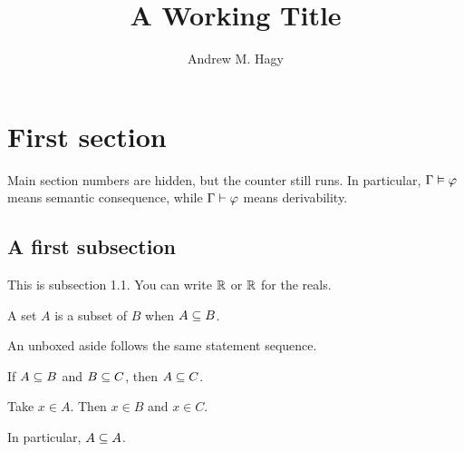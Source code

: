 \documentclass[11pt,letterpaper,twoside]{article}
\title{A Working Title}
\author{Andrew M. Hagy}
\date{}
\begin{document}
\setcounter{page}{0} %

\AndyMakeTitle

\section{First section}
Main section numbers are hidden, but the counter still runs. In particular,
$\Gamma\mathrel{\vDash}\varphi$ means semantic consequence, while
$\Gamma\mathrel{\vdash}\varphi$ means derivability.

\subsection{A first subsection}
This is subsection 1.1. You can write $\mathbb{R}$ or $\mathbb{R}$ for the reals.

\begin{DefinitionBlock}[Sample]
A set $A$ is a subset of $B$ when $A\subseteq B$.
\end{DefinitionBlock}

\begin{aside}
An unboxed aside follows the same statement sequence.
\end{aside}

\begin{TheoremBlock}
If $A\subseteq B$ and $B\subseteq C$, then $A\subseteq C$.
\begin{ProofBlock}
Take $x\in A$. Then $x\in B$ and $x\in C$.
\end{ProofBlock}
\end{TheoremBlock}

\begin{CorollaryBlock}
In particular, $A\subseteq A$.
\end{CorollaryBlock}

\end{document}
